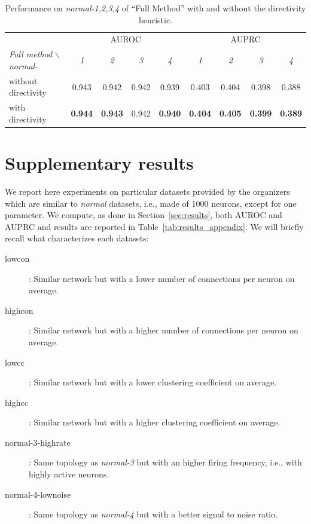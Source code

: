 \documentclass[wcp]{jmlr}
\begin{document}
\begin{table}[ht]\label{tab:comparison}
\centering
\small
\begin{tabular}{| l | c c c c | c c c c |}
\hline
& \multicolumn{4}{c|}{AUROC} & \multicolumn{4}{c|}{AUPRC} \\
\textit{Full method} $\backslash$ \textit{normal-} & \textit{1} & \textit{2} & \textit{3} & \textit{4} & \textit{1} & \textit{2} & \textit{3} & \textit{4} \\
\hline
\hline
 without directivity & 0.943 & 0.942 & 0.942 & 0.939 & 0.403 & 0.404 & 0.398 & 0.388  \\
  with directivity  & \textbf{0.944} & \textbf{0.943} & 0.942 & \textbf{0.940} & \textbf{0.404} & \textbf{0.405} & \textbf{0.399} & \textbf{0.389}\\
\hline
\end{tabular}
\caption{Performance on \textit{normal-1,2,3,4} of ``Full Method'' with and without the directivity heuristic.}
\label{tab:directivity}
\end{table}

\section{Supplementary results}
\label{app:supp}


We report here experiments on particular datasets provided by the organizers
which are similar to \textit{normal} datasets, i.e., made of 1000 neurons,
except for one parameter. We compute, as done in
Section~\ref{sec:results}, both AUROC and AUPRC and results are reported in
Table~\ref{tab:results_appendix}. We will briefly recall what characterizes
each datasets:
\begin{description}
\item[lowcon]: Similar network but with a lower number of connections per neuron on average.
\item[highcon]: Similar network but with a higher number of connections per neuron on average.
\item[lowcc]: Similar network but with a lower clustering coefficient on average.
\item[highcc]: Similar network but with a higher clustering coefficient on average.
\item[normal-3-highrate]: Same topology as \textit{normal-3} but with an higher firing frequency, i.e., with highly active neurons.
\item[normal-4-lownoise]: Same topology as \textit{normal-4} but with a better signal to noise ratio.
\end{description}
\end{document}
